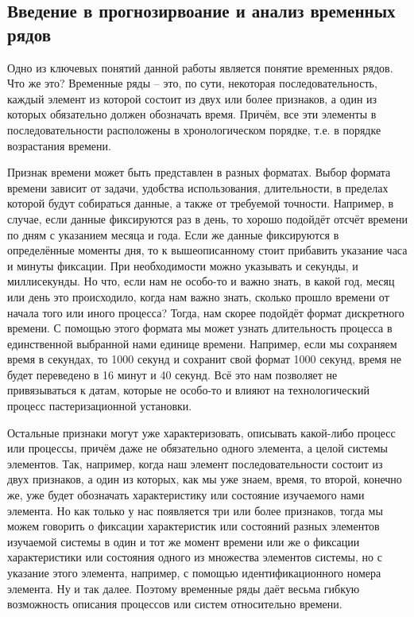 \subsection*{Введение в прогнозирвоание и анализ временных рядов} %
{\cyrillicfont %
\fontsize{13pt}{16.25pt}\selectfont %
\setlength{\parindent}{1.25cm} %
\englishfont %

  \par Одно из ключевых понятий данной работы является понятие временных рядов. Что же это? Временные ряды – это, по сути, некоторая последовательность, каждый элемент из которой состоит из двух или более признаков, а один из которых обязательно должен обозначать время. Причём, все эти элементы в последовательности расположены в хронологическом порядке, т.е. в порядке возрастания времени. 

  \par Признак времени может быть представлен в разных форматах. Выбор формата времени зависит от задачи, удобства использования, длительности, в пределах которой будут собираться данные, а также от требуемой точности. Например, в случае, если данные фиксируются раз в день, то хорошо подойдёт отсчёт времени по дням с указанием месяца и года. Если же данные фиксируются в определённые моменты дня, то к вышеописанному стоит прибавить указание часа и минуты фиксации. При необходимости можно указывать и секунды, и миллисекунды. Но что, если нам не особо-то и важно знать, в какой год, месяц или день это происходило, когда нам важно знать, сколько прошло времени от начала того или иного процесса? Тогда, нам скорее подойдёт формат дискретного времени. С помощью этого формата мы может узнать длительность процесса в единственной выбранной нами единице времени. Например, если мы сохраняем время в секундах, то 1000 секунд и сохранит свой формат 1000 секунд, время не будет переведено в 16 минут и 40 секунд. Всё это нам позволяет не привязываться к датам, которые не особо-то и влияют на технологический процесс пастеризационной установки.

  \par Остальные признаки могут уже характеризовать, описывать какой-либо процесс или процессы, причём даже не обязательно одного элемента, а целой системы элементов. Так, например, когда наш элемент последовательности состоит из двух признаков, а один из которых, как мы уже знаем, время, то второй, конечно же, уже будет обозначать характеристику или состояние изучаемого нами элемента. Но как только у нас появляется три или более признаков, тогда мы можем говорить о фиксации характеристик или состояний разных элементов изучаемой системы в один и тот же момент времени или же о фиксации характеристики или состояния одного из множества элементов системы, но с указание этого элемента, например, с помощью идентификационного номера элемента. Ну и так далее. Поэтому временные ряды даёт весьма гибкую возможность описания процессов или систем относительно времени. 

}
